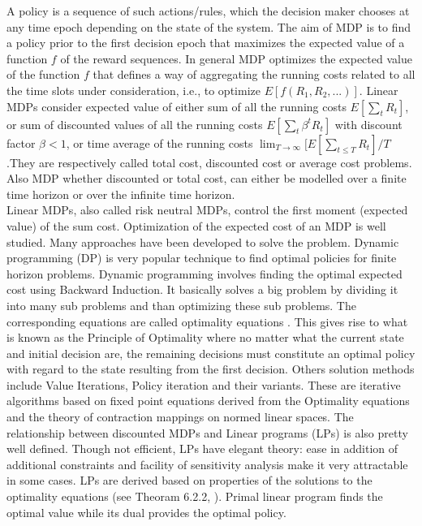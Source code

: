 \documentclass[11pt,a4paper,oneside]{report}
\begin{document}
\noindent A policy is a sequence of such actions/rules, which the decision maker chooses at any time epoch depending on the state of the system. The aim of MDP is to find a policy prior to the first decision epoch that maximizes the expected value of a function $f$ of the reward sequences. In general MDP optimizes the expected value of the function $f$ that defines a way of aggregating the running costs related to all the time slots under consideration, i.e., to optimize $E[f(R_1,R_2,...)]$. Linear MDPs consider expected value of either sum of all the running costs $E[\sum_t{R_t} ]$, or sum of discounted values of all the running costs $E[\sum_t{\beta^t {R_t}} ]$ with discount factor $\beta<1$, or time average of the running costs $\lim_{T \to \infty}{[E[ \sum_{t\leq T}{R_t}]}{/T}$ .They are respectively called total cost, discounted cost or average cost problems. Also MDP whether discounted or total cost, can either be modelled over a finite time horizon or over the infinite time horizon. \\


\noindent Linear MDPs, also called risk neutral MDPs, control the first moment (expected value) of the sum cost. Optimization of the expected cost of an MDP is well studied. Many approaches have been developed to solve the problem. Dynamic programming (DP) is very popular technique to find optimal policies for finite horizon problems. Dynamic programming involves finding the optimal expected cost using Backward Induction. It basically solves a big problem by dividing it into many sub problems and than optimizing these sub problems. The corresponding equations are called optimality equations \citep{puterman1990market}. This gives rise to what is known as the Principle of Optimality where no matter what the current state and initial decision are, the remaining decisions must constitute an optimal policy with regard to the state resulting from the first decision. Others solution methods include Value Iterations, Policy iteration and their variants. These are iterative algorithms based on fixed point equations derived from the Optimality equations and the theory of contraction mappings on normed linear spaces. The relationship between discounted MDPs and Linear programs (LPs) is also pretty well defined. Though not efficient, LPs have elegant theory: ease in addition of additional constraints and facility of sensitivity analysis make it very attractable in some cases. LPs are derived based on properties of the solutions to the optimality equations (see Theoram 6.2.2, \cite{puterman1990market}). Primal linear program finds the optimal value while its dual provides the optimal policy.\\
\end{document}
